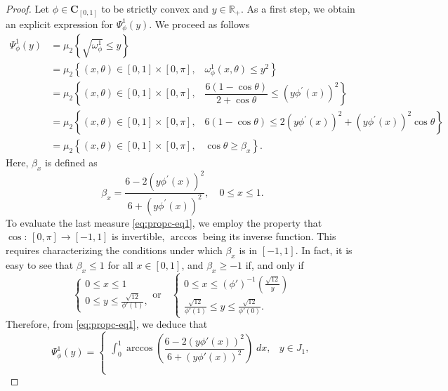 \documentclass[10pt,a4paper]{amsart}
\begin{document}
\begin{proof}
Let $\phi\in\mathbf{C}_{[0,1]}$ to be strictly convex and $y\in \mathbb{R}_+$. As a first step, we obtain an explicit expression for $\Psi_{\phi}^{1}(y)$. We proceed as follows
\begin{align}\label{eq:propc-eq1}
\Psi_{\phi}^{1}(y)&= \mu_2\left\{ \sqrt{\omega_{\phi}^1}\leq y\right\} \nonumber\\
& =\mu_2\left\{ (x,\theta)\in [0,1]\times[0,\pi],\;\;\; \omega_{\phi}^1(x,\theta)\leq y^2 \right\} \nonumber \\
 & =\mu_2\left\{ (x,\theta)\in [0,1]\times[0,\pi],\;\;\; \dfrac{6(1-\cos{\theta})}{2+\cos{\theta}}\leq \left(y \phi^{'}(x)\right)^2 \right\} \nonumber\\
 &= \mu_2\left\{ (x,\theta)\in [0,1]\times[0,\pi],\;\;\; 6(1-\cos{\theta})\leq 2 \left(y \phi^{'}(x)\right)^2 + \left(y \phi^{'}(x)\right)^2 \cos{\theta} \right\}\nonumber\\
 &= \mu_2\left\{ (x,\theta)\in [0,1]\times[0,\pi],\;\;\; \cos{\theta}\geq \beta_x \right\}.
\end{align}
Here, $\beta_x$ is defined as
$$
\beta_x = \dfrac{6-2 \left(y\phi^{'}(x)\right)^2}{6+\left(y \phi^{'}(x)\right)^2}, \quad 0 \leq x \leq 1. 
$$
To evaluate the last measure \eqref{eq:propc-eq1}, we employ the property that $\cos:\, [0, \pi] \longrightarrow [-1,1]$ is invertible, $\arccos$ being its inverse function. This requires characterizing the conditions under which $\beta_x$ is in $[-1, 1]$. In fact, it is easy to see that $\beta_x \leq 1$ for all $x \in [0,1]$, and $\beta_x \geq -1$ if, and only if
\begin{equation*}
    \left\{
\begin{array}{ll}
0 \leq x \leq 1 \\
0 \leq y \leq \frac{\sqrt{12}}{\phi'(1)}, 
 \end{array}
\right. \text{or} \quad \left\{
\begin{array}{ll}
0 \leq x \leq \left(\phi' \right)^{-1} \left( \frac{\sqrt{12}}{y} \right)\\
\frac{\sqrt{12}}{\phi'(1)} \leq y \leq \frac{\sqrt{12}}{\phi'(0)}.
\end{array}
\right.
\end{equation*}
Therefore, from \eqref{eq:propc-eq1}, we deduce that
\begin{equation}\label{psiequa}
  \Psi_{\phi}^{1}(y)=\left\{
\begin{array}{ll}
  \displaystyle\int_{0}^{1}\arccos\left(  \dfrac{6-2\left( y\phi'(x)\right)^2}{6+\left( y\phi'(x)\right)^2}\right)\;dx, &y\in J_1,\\\\


\end{array}
\end{equation}
\end{proof}
\end{document}
